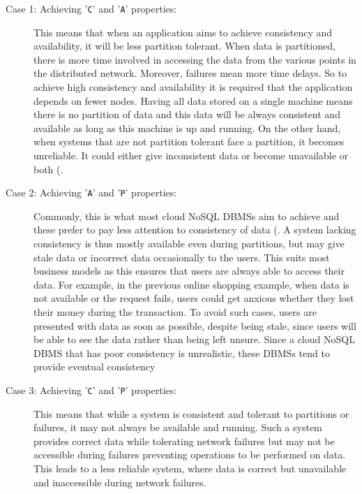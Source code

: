 \begin{description}
	\item [Case 1: Achieving '\texttt{C}' and '\texttt{A}' properties:] This means
	that when an application aims to achieve consistency and availability, it will
	be less partition tolerant.
	When data is partitioned,   there is more time involved in accessing the data
	from the various points in the distributed network.  Moreover,   failures mean
	more time delays.  So to achieve high consistency and availability it is
	required that the application depends on fewer nodes.  Having all data stored on
	a single machine means there is no partition of data and this data will be
	always consistent and available as long as this machine is up and running.   On
	the other hand,   when systems that are not partition tolerant face a partition,
	it becomes unreliable.  It could either give inconsistent data or become
	unavailable or both (.
		
	\item [Case 2: Achieving '\texttt{A}' and '\texttt{P}' properties:]
	Commonly,   this is what most cloud \ac{NoSQL} \acp{DBMS} aim to achieve and these
	prefer to pay less attention to consistency of data (. 
	A system lacking consistency is thus mostly available even during partitions,   but
	may give stale data or incorrect data occasionally to the users.  This suits
	most business models as this ensures that users are always able to
	access their data.  For example,   in the previous online shopping example,   when
	data is not available or the request fails,   users could get anxious whether
	they lost their money during the transaction.  To avoid such cases,   users
	are presented with data as soon as possible,   despite being stale,   since users
	will be able to see the data rather than being left unsure. 
	Since a cloud \ac{NoSQL} \ac{DBMS} that has poor consistency is unrealistic,  
	these \acp{DBMS} tend to provide eventual consistency
	
	\item [Case 3: Achieving '\texttt{C}' and '\texttt{P}' properties:] This means
	that while a system is consistent and tolerant to partitions or
	failures,   it may not always be available and running.  Such a system 
	provides correct data while tolerating network failures but may not be
	accessible during failures preventing operations to be performed on data.  This
	leads to a less reliable system,   where data is correct but unavailable and
	inaccessible during network failures.
	
	 
\end{description}

